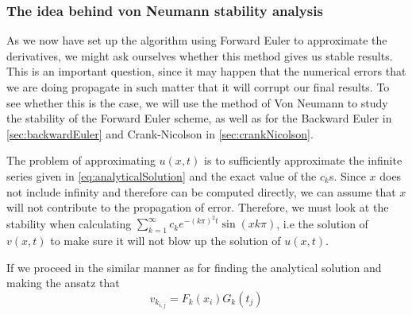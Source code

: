\subsubsection{The idea behind von Neumann stability analysis}\label{sec:ideaNeumann}
As we now have set up the algorithm using Forward Euler to approximate the derivatives, we might ask ourselves whether this method gives us stable results. This is an important question, since it may happen that the numerical errors that we are doing propagate in such matter that it will corrupt our final results. To see whether this is the case, we will use the method of Von Neumann to study the stability of the Forward Euler scheme, as well as for the Backward Euler in \vref{sec:backwardEuler} and Crank-Nicolson in \vref{sec:crankNicolson}.


The problem of approximating \(u(x,t)\) is to sufficiently approximate the infinite series given in \vref{eq:analyticalSolution} and the exact value of the \(c_k\)s. Since \( x\) does not include infinity and therefore can be computed directly, we can assume that \(x\) will not contribute to the propagation of error. Therefore, we must look at the stability when calculating \( \sum_{k=1}^\infty c_ke^{-(k\pi)^2t}\sin(xk\pi) \), i.e the solution of \(v(x,t)\) to make sure it will not blow up the solution of \(u(x,t)\).

If we proceed in the similar manner as for finding the analytical solution and making the ansatz that
\begin{equation}\label{eq:discreteAnsatz}
v_{k_{i,j}} = F_k(x_i)G_k(t_j)
\end{equation}

